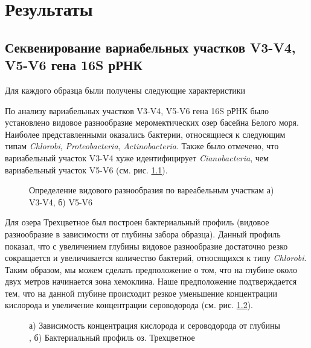 \chapter{Результаты} \label{chapt2}

\section{Секвенирование вариабельных участков V3-V4, V5-V6 гена 16S рРНК} \label{sect2_1}

Для каждого образца были получены следующие характеристики

По анализу вариабельных участков V3-V4, V5-V6 гена 16S рРНК было установлено видовое разнообразие меромектических озер басейна Белого моря. Наиболее представленными оказались бактерии, относящиеся к следующим типам \textit{Chlorobi}, \textit{Proteobacteria}, \textit{Actinobacteria}.  Также было отмечено, что вариабельный участок V3-V4 хуже идентифицирует \textit{Cianobacteria}, чем вариабельный участок V5-V6   (см. рис. \ref{ris:V3-V4, V5-V6}). 


\begin{figure}[h]
\begin{minipage}[h]{0.5\linewidth}
\end{minipage}
\hfill
\begin{minipage}[h]{0.5\linewidth}
\end{minipage}
\caption{Определение видового разнообразия по вареабельным участкам а) V3-V4, б) V5-V6}
\label{ris:V3-V4, V5-V6}
\end{figure}


Для озера Трехцветное был построен бактериальный профиль (видовое разнообразие в зависимости от глубины забора образца). Данный профиль показал, что с увеличением глубины видовое разнообразие достаточно резко сокращается и увеличивается количество бактерий, относящихся к типу   \textit{Chlorobi}. Таким образом, мы можем сделать предположение о том, что на глубине около двух метров начинается зона хемоклина. Наше предположение подтверждается тем, что на данной глубине происходит резкое уменьшение концентрации кислорода и увеличение концентрации сероводорода (см. рис. \ref{ris:concentr, 3cvet}).  

\begin{figure}[h]
\begin{minipage}[h]{0.5\linewidth}
\end{minipage}
\hfill
\begin{minipage}[h]{0.5\linewidth}
\end{minipage}
\caption{а) Зависимость концентрация кислорода и сероводорода от глубины , б) Бактериальный профиль оз. Трехцветное}
\label{ris:concentr, 3cvet}
\end{figure}

